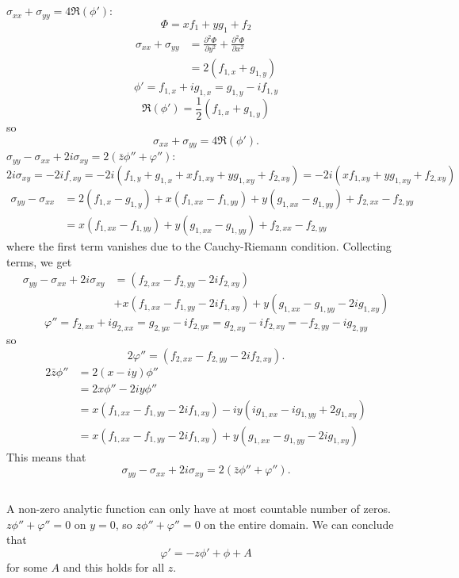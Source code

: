 \documentclass[12pt]{article}
\newcommand{\pr}{{\partial}}
\begin{document}
\subsection{}
$\sigma_{xx} + \sigma_{yy} = 4{\mathfrak R}(\phi')$:
\[
\Phi = xf_1 +yg_1 + f_2 
\]
\begin{align*}
  \sigma_{xx} + \sigma_{yy} &= \frac{\pr ^2\Phi}{\pr y^2}+ \frac{\pr ^2\Phi}{\pr x^2}\\
  &= 2(f_{1,x}+g_{1,y} )
\end{align*}
\[
\phi' = f_{1,x} + ig_{1,x} = g_{1,y} - if_{1,y}
\]
\[
\mathfrak R(\phi') = \frac 1 2 (f_{1,x} + g_{1,y})
\]
so
\[
\sigma_{xx} + \sigma_{yy} = 4{\mathfrak R}(\phi').
\]
$\sigma_{yy} - \sigma_{xx} + 2i\sigma_{xy} = 2(\bar z \phi''+\varphi'')$:
\[
  2i\sigma_{xy} = -2if_{,xy}=  -2i(f_{1,y}+g_{1,x} + xf_{1,xy} + yg_{1,xy} +f_{2,xy} )= -2i (xf_{1,xy} + yg_{1,xy} +f_{2,xy} )
\]
\begin{align*}
  \sigma_{yy} - \sigma_{xx} &=  2(f_{1,x}-g_{1,y}) + x(f_{1,xx} - f_{1,yy}) + y(g_{1,xx} - g_{1,yy} )+ f_{2,xx} - f_{2,yy}\\
  &= x(f_{1,xx} - f_{1,yy}) + y(g_{1,xx} - g_{1,yy} )+ f_{2,xx} - f_{2,yy}
\end{align*}
where the first term vanishes due to the Cauchy-Riemann condition. Collecting terms, we get
\begin{align*}
  \sigma_{yy} - \sigma_{xx} + 2i\sigma_{xy} &= (f_{2,xx} - f_{2,yy} -2if_{2,xy})\\
  &+x(f_{1,xx} - f_{1,yy}-2if_{1,xy}) +y(g_{1,xx} - g_{1,yy} - 2ig_{1,xy})
\end{align*}
\[
\varphi'' = f_{2,xx} + ig_{2,xx} = g_{2,yx} - if_{2,yx} =  g_{2,xy} - if_{2,xy} = -f_{2,yy} - ig_{2,yy}
\]
so
\[
2\varphi'' = (f_{2,xx} - f_{2,yy} -2if_{2,xy}).
\]
\begin{align*}
  2\bar z \phi'' &=2 (x-iy)\phi''\\
  &=2x\phi'' -2iy\phi''\\
  &=x(f_{1,xx} - f_{1,yy}-2if_{1,xy}) -iy(ig_{1,xx} - ig_{1,yy} + 2g_{1,xy})\\
  &=x(f_{1,xx} - f_{1,yy}-2if_{1,xy}) +y(g_{1,xx} - g_{1,yy} - 2ig_{1,xy})
\end{align*}
This means that 
$$\sigma_{yy} - \sigma_{xx} + 2i\sigma_{xy} = 2(\bar z \phi''+\varphi'').$$

\subsection{}
A non-zero analytic function can only have at most countable number of zeros. $z\phi'' + \varphi'' = 0$ on $y=0$, so $z\phi'' + \varphi'' = 0$ on the entire domain. We can conclude that
\[
\varphi' = -z\phi' + \phi + A
\]
for some  $A$ and this holds for all $z$.
\end{document}
